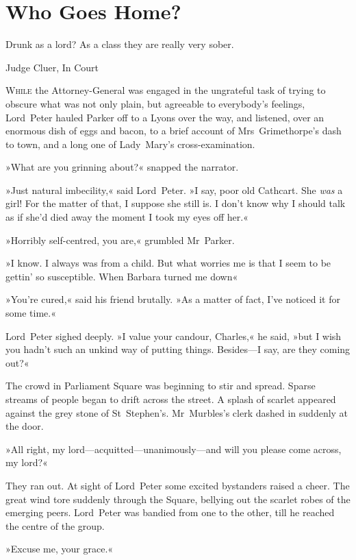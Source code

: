 
\chapter{Who Goes Home?}

\epigraph{Drunk as a lord? As a class they are really very sober.}{Judge Cluer, In Court}


\lettrine[lines=4]{W}{hile} the Attorney-General was engaged in the ungrateful task of trying to obscure what was not only plain, but agreeable to everybody's feelings, Lord~Peter hauled Parker off to a Lyons over the way, and listened, over an enormous dish of eggs and bacon, to a brief account of Mrs~Grimethorpe's dash to town, and a long one of Lady~Mary's cross-examination.

»What are you grinning about?« snapped the narrator.

»Just natural imbecility,« said Lord~Peter. »I say, poor old Cathcart.  She \textit{was} a girl! For the matter of that, I suppose she still is. I don't know why I should talk as if she'd died away the moment I took my eyes off her.«

»Horribly self-centred, you are,« grumbled Mr~Parker.

»I know. I always was from a child. But what worries me is that I seem to be gettin' so susceptible. When Barbara turned me down\longdash«

»You're cured,« said his friend brutally. »As a matter of fact, I've noticed it for some time.«

Lord~Peter sighed deeply. »I value your candour, Charles,« he said, »but I wish you hadn't such an unkind way of putting things. Besides—I say, are they coming out?«

The crowd in Parliament Square was beginning to stir and spread. Sparse streams of people began to drift across the street. A splash of scarlet appeared against the grey stone of St~Stephen's. Mr~Murbles's clerk dashed in suddenly at the door.

»All right, my lord—acquitted—unanimously—and will you please come across, my lord?«

They ran out. At sight of Lord~Peter some excited bystanders raised a cheer. The great wind tore suddenly through the Square, bellying out the scarlet robes of the emerging peers. Lord~Peter was bandied from one to the other, till he reached the centre of the group.

»Excuse me, your grace.«


